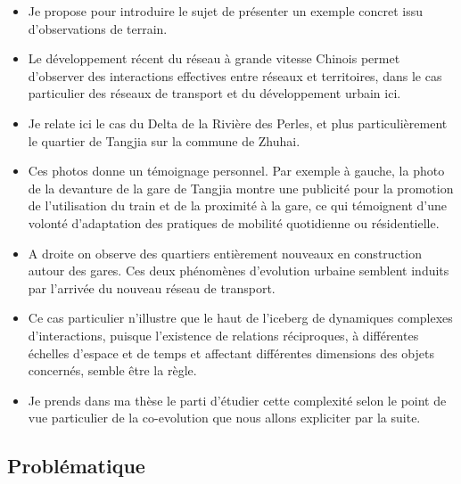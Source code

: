 \documentclass[12pt]{article}
\begin{document}
\begin{itemize}
	\item Je propose pour introduire le sujet de présenter un exemple concret issu d'observations de terrain.
	\item Le développement récent du réseau à grande vitesse Chinois permet d'observer des interactions effectives entre réseaux et territoires, dans le cas particulier des réseaux de transport et du développement urbain ici.
	\item Je relate ici le cas du Delta de la Rivière des Perles, et plus particulièrement le quartier de Tangjia sur la commune de Zhuhai.
	\item Ces photos donne un témoignage personnel. Par exemple à gauche, la photo de la devanture de la gare de Tangjia montre une publicité pour la promotion de l'utilisation du train et de la proximité à la gare, ce qui témoignent d'une volonté d'adaptation des pratiques de mobilité quotidienne ou résidentielle.
	\item A droite on observe des quartiers entièrement nouveaux en construction autour des gares. Ces deux phénomènes d'evolution urbaine semblent induits par l'arrivée du nouveau réseau de transport.
	\item Ce cas particulier n'illustre que le haut de l'iceberg de dynamiques complexes d'interactions, puisque l'existence de relations réciproques, à différentes échelles d'espace et de temps et affectant différentes dimensions des objets concernés, semble être la règle.
	\item Je prends dans ma thèse le parti d'étudier cette complexité selon le point de vue particulier de la co-evolution que nous allons expliciter par la suite.
\end{itemize}



\newpage


\subsection*{Problématique}
\end{document}
